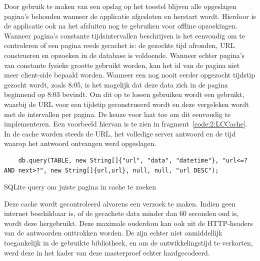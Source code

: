 Door gebruik te maken van een opslag op het toestel blijven alle opgeslagen pagina's behouden wanneer de applicatie afgesloten en herstart wordt. Hierdoor is de applicatie ook na het afsluiten nog te gebruiken voor offline opzoekingen. Wanneer pagina's constante tijdsintervallen beschrijven is het eenvoudig om te controleren of een pagina reeds gecachet is: de gezochte tijd afronden, URL construeren en opzoeken in de database is voldoende. Wanneer echter pagina's van constante fysieke grootte gebruikt worden, kan het id van de pagina niet meer client-side bepaald worden. Wanneer een nog nooit eerder opgezocht tijdstip gezocht wordt, zoals 8:05, is het mogelijk dat deze data zich in de pagina beginnend op 8:03 bevindt. Om dit op te lossen gebruiken wordt een  gebruikt, waarbij de URL voor een tijdstip geconstrueerd wordt en deze vergeleken wordt met de intervallen per pagina. De keuze voor  laat toe om dit eenvoudig te implementeren. Een voorbeeld hiervan is te zien in fragment~\ref{code:2:LCCache}. In de cache worden steeds de URL, het volledige server antwoord en de tijd waarop het antwoord ontvangen werd opgeslagen.

\begin{listing}[!h]
	\begin{verbatim}
    db.query(TABLE, new String[]{"url", "data", "datetime"}, "url<=? AND next>?", new String[]{url,url}, null, null, "url DESC");
	\end{verbatim}
	\caption[Zoeken van pagina's in offline cache]{SQLite query om juiste pagina in cache te zoeken}
	\label{code:2:LCCache}
\end{listing}

Deze cache wordt gecontroleerd alvorens een verzoek te maken. Indien geen internet beschikbaar is, of de gecachete data minder dan 60 seconden oud is, wordt deze hergebruikt. Deze maximale ouderdom kan ook uit de HTTP-headers van de antwoorden onttrokken worden. De  zijn echter niet onmiddellijk toegankelijk in de gebruikte bibliotheek, en om de ontwikkelingstijd te verkorten, werd deze in het kader van deze masterproef echter hardgecodeerd.

